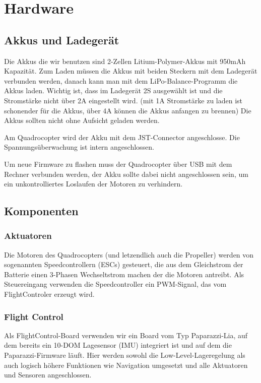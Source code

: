 \section{Hardware}

\subsection{Akkus und Ladegerät}
Die Akkus die wir benutzen sind 2-Zellen Litium-Polymer-Akkus mit 950mAh Kapazität.
Zum Laden müssen die Akkus mit beiden Steckern mit dem Ladegerät verbunden werden, danach kann man mit dem LiPo-Balance-Programm die Akkus laden.
Wichtig ist, dass im Ladegerät 2S ausgewählt ist und die Stromstärke nicht über 2A eingestellt wird.
(mit 1A Stromstärke zu laden ist schonender für die Akkus, über 4A können die Akkus anfangen zu brennen)
Die Akkus sollten nicht ohne Aufsicht geladen werden.

Am Quadrocopter wird der Akku mit dem JST-Connector angeschlosse. Die Spannungsüberwachung ist intern angeschlossen.

Um neue Firmware zu flashen muss der Quadrocopter über USB mit dem Rechner verbunden werden, der Akku sollte dabei nicht angeschlossen sein, um ein unkontrolliertes Loslaufen der Motoren zu verhindern.

\subsection{Komponenten}
\subsubsection{Aktuatoren}

Die Motoren des Quadrocopters (und letzendlich auch die Propeller) werden von sogenannten Speedcontrollern (ESCs) gesteuert, die aus dem Gleichstrom der Batterie einen 3-Phasen Wechseltstrom machen der die Motoren antreibt.
Als Steuereingang verwenden die Speedcontroller ein PWM-Signal, das vom FlightControler erzeugt wird.


\subsubsection{Flight Control}

Als FlightControl-Board verwenden wir ein Board vom Typ Paparazzi-Lia, auf dem bereits ein 10-DOM Lagesensor (IMU) integriert ist und auf dem die Paparazzi-Firmware läuft. Hier werden sowohl die Low-Level-Lageregelung als auch logisch höhere Funktionen wie Navigation umgesetzt und alle Aktuatoren und Sensoren angeschlossen.

